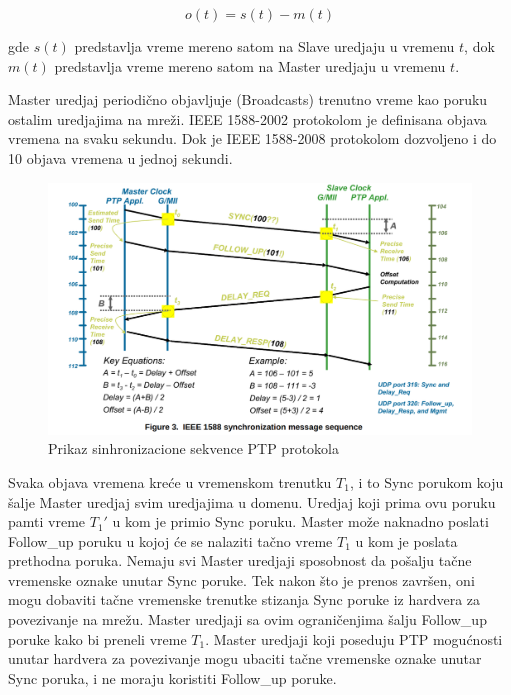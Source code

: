 \documentclass[a4paper,12pt, master]{etf}
\begin{document}
        \begin{equation}
            o(t) = s(t) - m(t)
        \end{equation}

	gde $s(t)$ predstavlja vreme mereno satom na Slave uredjaju u vremenu $t$, dok $m(t)$
	predstavlja vreme mereno satom na Master uredjaju u vremenu $t$.

	Master uredjaj periodi\v{c}no objavljuje (Broadcasts) trenutno vreme kao poruku ostalim
	uredjajima na mre\v{z}i. IEEE 1588-2002 protokolom je definisana objava vremena na svaku
	sekundu. Dok je IEEE 1588-2008 protokolom dozvoljeno i do 10 objava vremena u jednoj
	sekundi.

        \begin{figure}[htb]
                \centering
                \includegraphics[scale=.3]{../pic/ieee_1588_sync_sequence.png}
                \caption{Prikaz sinhronizacione sekvence PTP protokola}
                \label{fig:ieee_1588_sync_sequence}
        \end{figure}

        Svaka objava vremena kre\'{c}e u vremenskom trenutku $T_1$, i to Sync porukom koju \v{s}alje
        Master uredjaj svim uredjajima u domenu. Uredjaj koji prima ovu poruku pamti vreme $T_1'$ u
        kom je primio Sync poruku. Master mo\v{z}e naknadno poslati Follow\_up poruku u kojoj \'{c}e
        se nalaziti ta\v{c}no vreme $T_1$ u kom je poslata prethodna poruka. Nemaju svi Master uredjaji
        sposobnost da po\v{s}alju ta\v{c}ne vremenske oznake unutar Sync poruke. Tek nakon \v{s}to je
        prenos zavr\v{s}en, oni mogu dobaviti ta\v{c}ne vremenske trenutke stizanja Sync poruke iz
        hardvera za povezivanje na mre\v{z}u. Master uredjaji sa ovim ograni\v{c}enjima \v{s}alju
        Follow\_up poruke kako bi preneli vreme $T_1$. Master uredjaji koji poseduju PTP mogu\'{c}nosti
        unutar hardvera za povezivanje mogu ubaciti ta\v{c}ne vremenske oznake unutar Sync poruka, i
        ne moraju koristiti Follow\_up poruke.
\end{document}
